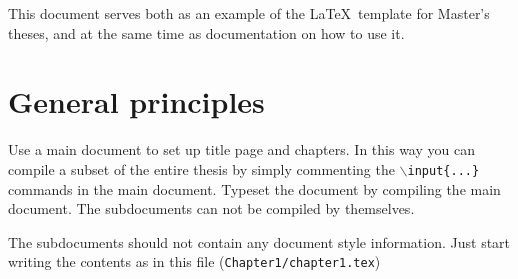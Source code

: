 This document serves both as an example of the \LaTeX\ template
for Master's theses, and at the same time as documentation
on how to use it.

\section{General principles}
Use a main document to set up title page and chapters. In this way
you can compile a subset of the entire thesis by simply commenting
the \texttt{$\backslash$input\{...\}} commands in the main document.
Typeset the document by compiling the main document. The
subdocuments can not be compiled by themselves.

The subdocuments should not contain any document style
information. Just start writing the contents as in this file
(\texttt{Chapter1/chapter1.tex})

